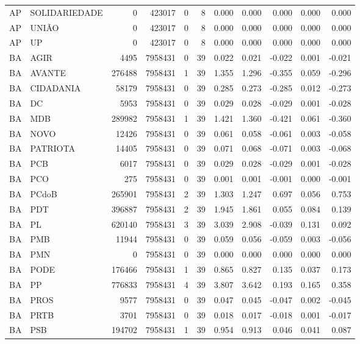 \begin{landscape}
\begin{longtable}{llrrrrrrrrr}
AP & SOLIDARIEDADE & 0 & 423017 & 0 & 8 & 0.000 & 0.000 & 0.000 & 0.000 & 0.000 \\
AP & UNIÃO & 0 & 423017 & 0 & 8 & 0.000 & 0.000 & 0.000 & 0.000 & 0.000 \\
AP & UP & 0 & 423017 & 0 & 8 & 0.000 & 0.000 & 0.000 & 0.000 & 0.000 \\
BA & AGIR & 4495 & 7958431 & 0 & 39 & 0.022 & 0.021 & -0.022 & 0.001 & -0.021 \\
BA & AVANTE & 276488 & 7958431 & 1 & 39 & 1.355 & 1.296 & -0.355 & 0.059 & -0.296 \\
BA & CIDADANIA & 58179 & 7958431 & 0 & 39 & 0.285 & 0.273 & -0.285 & 0.012 & -0.273 \\
BA & DC & 5953 & 7958431 & 0 & 39 & 0.029 & 0.028 & -0.029 & 0.001 & -0.028 \\
BA & MDB & 289982 & 7958431 & 1 & 39 & 1.421 & 1.360 & -0.421 & 0.061 & -0.360 \\
BA & NOVO & 12426 & 7958431 & 0 & 39 & 0.061 & 0.058 & -0.061 & 0.003 & -0.058 \\
BA & PATRIOTA & 14405 & 7958431 & 0 & 39 & 0.071 & 0.068 & -0.071 & 0.003 & -0.068 \\
BA & PCB & 6017 & 7958431 & 0 & 39 & 0.029 & 0.028 & -0.029 & 0.001 & -0.028 \\
BA & PCO & 275 & 7958431 & 0 & 39 & 0.001 & 0.001 & -0.001 & 0.000 & -0.001 \\
BA & PCdoB & 265901 & 7958431 & 2 & 39 & 1.303 & 1.247 & 0.697 & 0.056 & 0.753 \\
BA & PDT & 396887 & 7958431 & 2 & 39 & 1.945 & 1.861 & 0.055 & 0.084 & 0.139 \\
BA & PL & 620140 & 7958431 & 3 & 39 & 3.039 & 2.908 & -0.039 & 0.131 & 0.092 \\
BA & PMB & 11944 & 7958431 & 0 & 39 & 0.059 & 0.056 & -0.059 & 0.003 & -0.056 \\
BA & PMN & 0 & 7958431 & 0 & 39 & 0.000 & 0.000 & 0.000 & 0.000 & 0.000 \\
BA & PODE & 176466 & 7958431 & 1 & 39 & 0.865 & 0.827 & 0.135 & 0.037 & 0.173 \\
BA & PP & 776833 & 7958431 & 4 & 39 & 3.807 & 3.642 & 0.193 & 0.165 & 0.358 \\
BA & PROS & 9577 & 7958431 & 0 & 39 & 0.047 & 0.045 & -0.047 & 0.002 & -0.045 \\
BA & PRTB & 3701 & 7958431 & 0 & 39 & 0.018 & 0.017 & -0.018 & 0.001 & -0.017 \\
BA & PSB & 194702 & 7958431 & 1 & 39 & 0.954 & 0.913 & 0.046 & 0.041 & 0.087 \\

\end{longtable}
\end{landscape}
